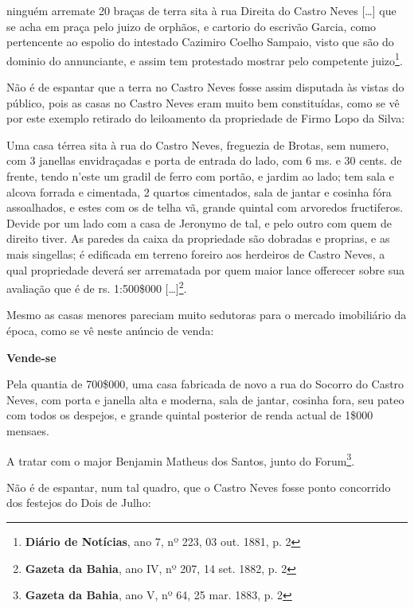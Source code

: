 \begin{citacao}
ninguém arremate 20 braças de terra sita à rua Direita do Castro Neves [\dots] que se acha em praça pelo juizo de orphãos, e cartorio do escrivão Garcia, como pertencente ao espolio do intestado Cazimiro Coelho Sampaio, visto que são do dominio do annunciante, e assim tem protestado mostrar pelo competente juizo\footnote{\textbf{Diário de Notícias}, ano 7, nº 223, 03 out. 1881, p. 2}.
\end{citacao}

Não é de espantar que a terra no Castro Neves fosse assim disputada às vistas do público, pois as casas no Castro Neves eram muito bem constituídas, como se vê por este exemplo retirado do leiloamento da propriedade de Firmo Lopo da Silva:

\begin{citacao}
Uma casa térrea sita à rua do Castro Neves, freguezia de Brotas, sem numero, com 3 janellas envidraçadas e porta de entrada do lado, com 6 ms. e 30 cents. de frente, tendo n'este um gradil de ferro com portão, e jardim ao lado; tem sala e alcova forrada e cimentada, 2 quartos cimentados, sala de jantar e cosinha fóra assoalhados, e estes com os de telha vã, grande quintal com arvoredos fructiferos. Devide por um lado com a casa de Jeronymo de tal, e pelo outro com quem de direito tiver. As paredes da caixa da propriedade são dobradas e proprias, e as mais singellas; é edificada em terreno foreiro aos herdeiros de Castro Neves, a qual propriedade deverá ser arrematada por quem maior lance offerecer sobre sua avaliação que é de rs. 1:500\$000 [\dots]\footnote{\textbf{Gazeta da Bahia}, ano IV, nº 207, 14 set. 1882, p. 2}.
\end{citacao}

Mesmo as casas menores pareciam muito sedutoras para o mercado imobiliário da época, como se vê neste anúncio de venda:

\begin{citacao}
\textbf{Vende-se}

Pela quantia de 700\$000, uma casa fabricada de novo a rua do Socorro do Castro Neves, com porta e janella alta e moderna, sala de jantar, cosinha fora, seu pateo com todos os despejos, e grande quintal posterior de renda actual de 1\$000 mensaes.

A tratar com o major Benjamin Matheus dos Santos, junto do Forum\footnote{\textbf{Gazeta da Bahia}, ano V, nº 64, 25 mar. 1883, p. 2}.
\end{citacao}

Não é de espantar, num tal quadro, que o Castro Neves fosse ponto concorrido dos festejos do Dois de Julho:

